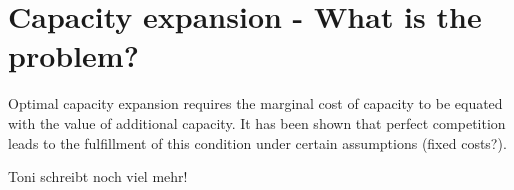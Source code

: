 \section{Capacity expansion - What is the problem?}

Optimal capacity expansion requires the marginal cost of capacity to be equated with the value of additional capacity. It has been shown that perfect competition leads to the fulfillment of this condition under certain assumptions (fixed costs?). 

\cite{Fehr1994}

Toni schreibt noch viel mehr!